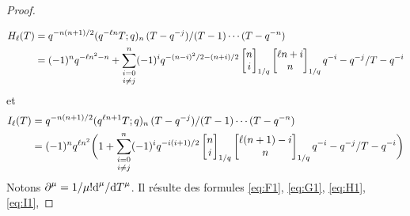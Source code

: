 \documentclass[12pt]{amsart}
\newcommand{\dd}{\textup{d}}
\theoremstyle{remark}
\numberwithin{equation}{section}
\begin{document}
\begin{proof}
\begin{align}
\end{align}
\begin{align}  \label{eq:H1}
H_{\ell}(T)&=q^{-n(n+1)/2}
\frac{(q^{-\ell n}T;q)_n\,(T-q^{-j})}
{(T-1)\cdots(T-q^{-n})}\\
\notag
&=(-1)^n q^{-\ell n^2-n}+\underset{i\ne j}{\sum_{{i=0}}^n}
(-1)^{i} 
q^{-(n-i)^2/2-(n+i)/2}
\begin{bmatrix} n\\  i\end{bmatrix}_{1/q}
\begin{bmatrix} \ell n+i\\ n\end{bmatrix}_{1/q}
\frac{q^{-i}-q^{-j}}{T-q^{-i}}
\end{align}
et
\begin{align}  \label{eq:I1}
I_{\ell}(T)&=q^{-n(n+1)/2}
\frac{(q^{\ell n+1}T;q)_n\,(T-q^{-j})}
{(T-1)\cdots(T-q^{-n})}\\
\notag
&=
(-1)^n q^{\ell n^2}\biggl(1+\underset{i\ne j}{\sum_{{i=0}}^n}
(-1)^{i} 
q^{-i(i+1)/2}
\begin{bmatrix} n\\  i\end{bmatrix}_{1/q}
\begin{bmatrix} \ell(n+1)-i\\ n\end{bmatrix}_{1/q}
\frac{q^{-i}-q^{-j}}{T-q^{-i}}\biggr)
\end{align}
Notons 
$\displaystyle \partial^{\mu }=
\frac{1}{\mu !}\frac{\dd^{\mu}}{\dd T^{\mu}}$.  Il r{\'e}sulte des formules 
\eqref{eq:F1}, \eqref{eq:G1}, \eqref{eq:H1}, \eqref{eq:I1},  

\end{proof}
\end{document}
